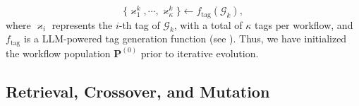 \documentclass{article}
\theoremstyle{plain}
\theoremstyle{definition}
\theoremstyle{remark}
\begin{document}
\begin{equation}  \label{eq:tag}
\{\varkappa^k_1, \cdots, \varkappa^k_\kappa\} \leftarrow f_\text{tag}(\mathcal{G}_k),  
\end{equation}  
where $\varkappa_i$ represents the $i$-th tag of $\mathcal{G}_k$, with a total of $\kappa$ tags per workflow, and $f_\text{tag}$ is a LLM-powered tag generation function (see  ).  Thus, we have initialized the workflow population \(\mathbf{P}^{(0)}\) prior to iterative evolution.









\vspace{-0.5em}
\subsection{Retrieval, Crossover, and Mutation}\label{sec:offspring}
\vspace{-0.5em}
\end{document}
